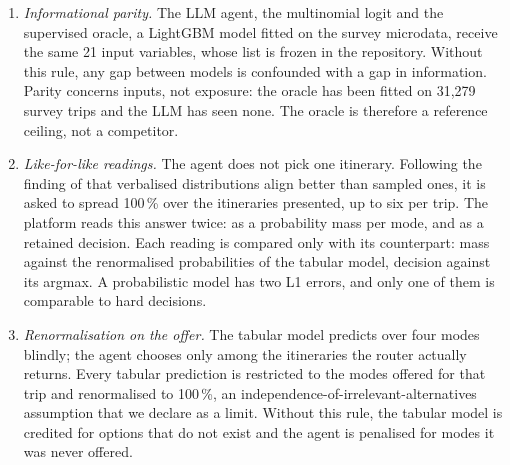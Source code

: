 \begin{enumerate}
  \item \emph{Informational parity.} The LLM agent, the multinomial logit and the supervised oracle, a LightGBM model \citep{ke2017lightgbm} fitted on the survey microdata, receive the same 21 input variables, whose list is frozen in the repository. %
  Without this rule, any gap between models is confounded with a gap in information. Parity concerns inputs, not exposure: the oracle has been fitted on 31,279 survey trips %
  and the LLM has seen none. The oracle is therefore a reference ceiling, not a competitor.
  \item \emph{Like-for-like readings.} The agent does not pick one itinerary. Following the finding of \citet{meister2024benchmarking} that verbalised distributions align better than sampled ones, it is asked to spread 100\,\% over the itineraries presented, up to six per trip. %
  The platform reads this answer twice: as a probability mass per mode, and as a retained decision. Each reading is compared only with its counterpart: mass against the renormalised probabilities of the tabular model, decision against its argmax. A probabilistic model has two L1 errors, and only one of them is comparable to hard decisions.
  \item \emph{Renormalisation on the offer.} The tabular model predicts over four modes blindly; the agent chooses only among the itineraries the router actually returns. Every tabular prediction is restricted to the modes offered for that trip and renormalised to 100\,\%, an independence-of-irrelevant-alternatives assumption that we declare as a limit. Without this rule, the tabular model is credited for options that do not exist and the agent is penalised for modes it was never offered.
\end{enumerate}

